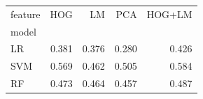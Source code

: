 \begin{tabular}{lrrrr}
\toprule
feature & HOG & LM & PCA & HOG+LM \\
model &  &  &  &  \\
\midrule
LR & 0.381 & 0.376 & 0.280 & 0.426 \\
SVM & 0.569 & 0.462 & 0.505 & 0.584 \\
RF & 0.473 & 0.464 & 0.457 & 0.487 \\
\bottomrule
\end{tabular}
